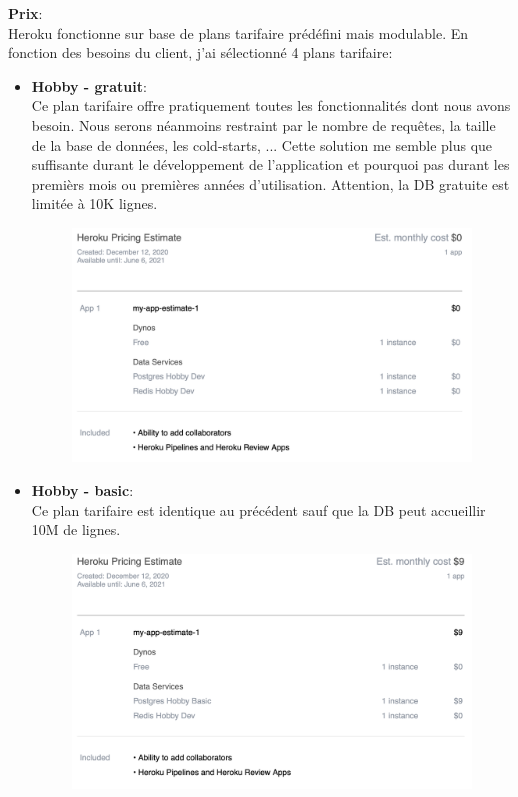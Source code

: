 \newpara
\textbf{Prix}: \\ Heroku fonctionne sur base de plans tarifaire prédéfini mais modulable. En fonction des besoins du client, j'ai sélectionné 4 plans tarifaire:
\begin{itemize}
  \newpage
  \item \textbf{Hobby - gratuit}: \\ Ce plan tarifaire offre pratiquement toutes les fonctionnalités dont nous avons besoin. Nous serons néanmoins restraint par le nombre de requêtes, la taille de la base de données, les cold-starts, ... Cette solution me semble plus que suffisante durant le développement de l'application et pourquoi pas durant les premièrs mois ou premières années d'utilisation. Attention, la DB gratuite est limitée à 10K lignes.
  \begin{figure}[H]
    \centering
    \includegraphics[width=0.75\linewidth]{img/heroku/Heroku_free.png}
  \end{figure}

  \item \textbf{Hobby - basic}: \\ Ce plan tarifaire est identique au précédent sauf que la DB peut accueillir 10M de lignes.
  \begin{figure}[H]
    \centering
    \includegraphics[width=0.75\linewidth]{img/heroku/Heroku_basic.png}
  \end{figure}
  

\end{itemize}
